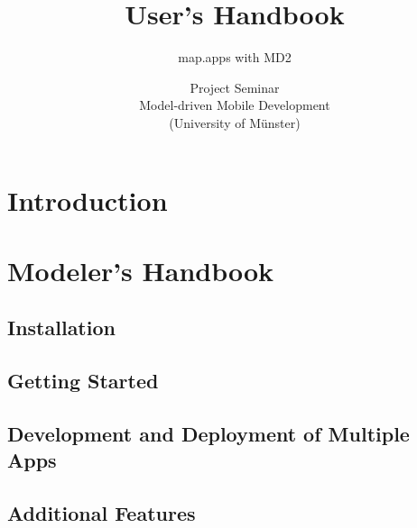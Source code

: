 \documentclass[a4paper, 12pt, titlepage, headsepline, listof = totoc, bibliography = totoc, numbers = noenddot]{scrbook} %
\title{User's Handbook}
\subtitle{map.apps with MD2}
\author{Project Seminar\\
Model-driven Mobile Development\\
(University of Münster)}
\begin{document}
\thispagestyle{empty}
\maketitle


\thispagestyle{empty}
\tableofcontents


\clearpage
\setcounter{page}{1}

\chapter{Introduction}


\chapter{Modeler's Handbook}
\label{cha:modelersHandbook}



\section{Installation}


\section{Getting Started}


\section{Development and Deployment of Multiple Apps}
\label{sec:developAndDeployMultiApps}


\section{Additional Features}

\end{document}
